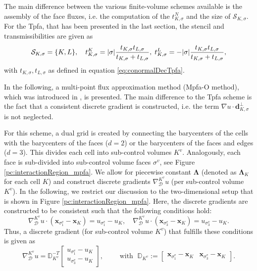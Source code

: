 The main difference between the various finite-volume schemes available is the assembly of the face fluxes, i.e. the computation of the $t^N_{K,\sigma}$ and the size of $\mathcal{S}_{K,\sigma}$. For the Tpfa, that has been presented in the last section, the stencil and transmissibilities are given as
\begin{equation*}
\mathcal{S}_{K,\sigma} = \lbrace K,L \rbrace, \quad t^K_{K,\sigma} =  \lvert{\sigma}\rvert  \frac{t_{K,\sigma} t_{L,\sigma}}{t_{K,\sigma} + t_{L,\sigma}},\; t^L_{K,\sigma} =  -\lvert{\sigma}\rvert  \frac{t_{K,\sigma} t_{L,\sigma}}{t_{K,\sigma} + t_{L,\sigma}},
\end{equation*}
with $t_{K,\sigma},t_{L,\sigma}$ as defined in equation \eqref{eq:conormalDecTpfa}.

In the following, a multi-point flux approximation method (Mpfa-O method), which was introduced in \citet{A3:aavatsmark:2002}, is presented. The main difference to the Tpfa scheme is the fact that a consistent discrete gradient is constructed, i.e. the term $\nabla u \cdot \mathbf{d}^{\bot}_{K,\sigma}$ is not neglected.

For this scheme, a dual grid is created by connecting the barycenters of the cells with the barycenters of the faces ($d=2$) or the barycenters of the faces and edges ($d=3$). This divides each cell into sub-control volumes $K^v$. Analogously, each face is sub-divided into sub-control volume faces $\sigma^v$, see Figure \ref{pc:interactionRegion_mpfa}. We allow for piecewise constant $\mathbf{\Lambda}$ (denoted as $\mathbf{\Lambda}_K$ for each cell $K$) and construct discrete gradients $\nabla_\mathcal{D}^{K^v} u$ (per sub-control volume $K^v$).
In the following, we restrict our discussion to the two-dimensional setup that is shown in Figure \ref{pc:interactionRegion_mpfa}.
Here, the discrete gradients are constructed to be consistent such that the following conditions hold:
\begin{equation}
\nabla_\mathcal{D}^{K^v} u \cdot (\mathbf{x}_{\sigma^v_1}- \mathbf{x}_{K}) = u_{\sigma^v_1} - u_K, \quad \nabla_\mathcal{D}^{K^v} u \cdot (\mathbf{x}_{\sigma^v_3}- \mathbf{x}_{K}) = u_{\sigma^v_3} - u_K.
\end{equation}
Thus, a discrete gradient (for sub-control volume $K^v$) that fulfills  these conditions is given as
\begin{equation}
\nabla_\mathcal{D}^{K^v} u  = \mathbb{D}^{-T}_{K^v}
 \begin{bmatrix}
  u_{\sigma^v_1} - u_K \\
  u_{\sigma^v_3} - u_K
 \end{bmatrix}, \qquad \text{ with }\; \mathbb{D}_{K^v} :=
  \begin{bmatrix}
   \mathbf{x}_{\sigma^v_1}- \mathbf{x}_K & \mathbf{x}_{\sigma^v_3} - \mathbf{x}_K
 \end{bmatrix}.
 \label{eq:MPFAGradientRecons}
\end{equation}

